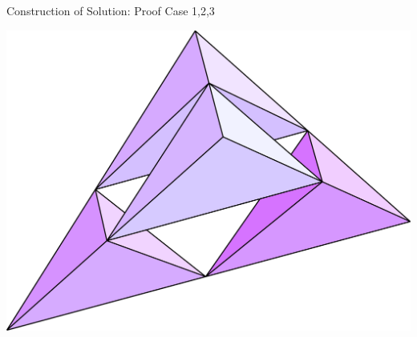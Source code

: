 \documentclass[xcolor=table]{beamer} %
\theoremstyle{definition}
\theoremstyle{plain}
\theoremstyle{remark}
\renewcommand{\a}[1]{\textcolor{dred}{#1}}
\renewcommand{\b}[1]{\textcolor{dblue}{#1}}
\begin{document}
\begin{frame}{Construction of Solution: Proof Case 1,2,3}
    
        
        
        
        

    
        \begin{center}
        \includegraphics[scale=1]{figure/concentric-cone-polytope.png}
    \end{center}
\end{frame}
\end{document}
